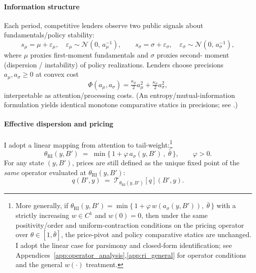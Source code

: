 \documentclass[12pt]{article}
\theoremstyle{plain}
\begin{document}
\paragraph{Information structure}
Each period, competitive lenders observe two public signals about
fundamentals/policy stability:
\[
	s_\mu = \mu + \varepsilon_\mu,\quad \varepsilon_\mu\sim \mathcal N(0,\,a_\mu^{-1}),\qquad
	s_\sigma = \sigma + \varepsilon_\sigma,\quad \varepsilon_\sigma\sim \mathcal N(0,\,a_\sigma^{-1}),
\]
where $\mu$ proxies first-moment fundamentals and $\sigma$ proxies second-
moment (dispersion / instability) of policy realizations. Lenders choose
precisions $a_\mu,a_\sigma\ge0$ at convex cost
\begin{equation}
	\Phi(a_\mu,a_\sigma) = \tfrac{\kappa_\mu}{2}a_\mu^2 + \tfrac{\kappa_\sigma}{2}a_\sigma^2,
	\label{eq:info_cost_micro}
\end{equation}
interpretable as attention/processing costs. (An entropy/mutual-information
formulation yields identical monotone comparative statics in precisions; see \citet{Sims2003, MackowiakWiederholt2009, MatejkaMcKay2015, Veldkamp2011}.)

\paragraph{Effective dispersion and pricing}
I adopt a linear mapping from attention to tail-weight:\footnote{More
	generally, if \(\theta_{\mathrm{RI}}(y,B')=\min\{\,1+\varphi\,
	w(a_\sigma(y,B'))\!,\;\bar\theta\,\}\) with a strictly increasing \(w\in C^1\)
	and \(w(0)=0\), then under the same positivity/order and uniform-contraction
	conditions on the pricing operator over \(\theta\in[1,\bar\theta]\), the
	price-pivot and policy comparative statics are unchanged. I adopt the linear
	case for parsimony and closed-form identification; see
	Appendices~\ref{app:operator_analysis},\ref{app:ri_general} for operator
	conditions and the general $w(\cdot)$ treatment.}
\begin{equation}
	\theta_{\mathrm{RI}}(y,B') \;=\; \min\Big\{\,1 + \varphi\, a_\sigma(y,B')\,,\; \bar\theta\,\Big\},\qquad \varphi>0.
	\label{eq:theta_RI_micro}
\end{equation}
For any state $(y,B')$, prices are still defined as the unique fixed point of
the \emph{same} operator evaluated at $\theta_{\mathrm{RI}}(y,B')$:
\begin{equation}
	q(B',y) \;=\; \mathcal T_{\theta_{\mathrm{RI}}(y,B')}[q](B',y).
	\label{eq:pricing_same_operator_micro}
\end{equation}
\end{document}
